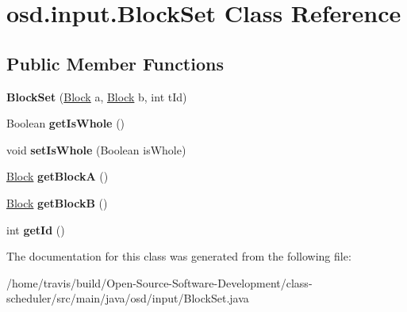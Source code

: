 \hypertarget{classosd_1_1input_1_1_block_set}{\section{osd.\-input.\-Block\-Set Class Reference}
\label{classosd_1_1input_1_1_block_set}
}
\subsection*{Public Member Functions}
\begin{DoxyCompactItemize}
\item 
\hypertarget{classosd_1_1input_1_1_block_set_a8fd250a4e0e3a3e750c9b196126b8d3f}{{\bfseries Block\-Set} (\hyperlink{interfaceosd_1_1input_1_1_block}{Block} a, \hyperlink{interfaceosd_1_1input_1_1_block}{Block} b, int t\-Id)}\label{classosd_1_1input_1_1_block_set_a8fd250a4e0e3a3e750c9b196126b8d3f}

\item 
\hypertarget{classosd_1_1input_1_1_block_set_a3783ae61ef0ac617b7a1a0bd8a7429b2}{Boolean {\bfseries get\-Is\-Whole} ()}\label{classosd_1_1input_1_1_block_set_a3783ae61ef0ac617b7a1a0bd8a7429b2}

\item 
\hypertarget{classosd_1_1input_1_1_block_set_a181c7721e45b3436f2fbf250016b84ca}{void {\bfseries set\-Is\-Whole} (Boolean is\-Whole)}\label{classosd_1_1input_1_1_block_set_a181c7721e45b3436f2fbf250016b84ca}

\item 
\hypertarget{classosd_1_1input_1_1_block_set_afee566d5e4864c98efbcd1905d8b6e2d}{\hyperlink{interfaceosd_1_1input_1_1_block}{Block} {\bfseries get\-Block\-A} ()}\label{classosd_1_1input_1_1_block_set_afee566d5e4864c98efbcd1905d8b6e2d}

\item 
\hypertarget{classosd_1_1input_1_1_block_set_a2afd5bc8227b04f9894fd4dc417fbfc9}{\hyperlink{interfaceosd_1_1input_1_1_block}{Block} {\bfseries get\-Block\-B} ()}\label{classosd_1_1input_1_1_block_set_a2afd5bc8227b04f9894fd4dc417fbfc9}

\item 
\hypertarget{classosd_1_1input_1_1_block_set_a38c5a636d48e3282af25c15f2269f2f5}{int {\bfseries get\-Id} ()}\label{classosd_1_1input_1_1_block_set_a38c5a636d48e3282af25c15f2269f2f5}

\end{DoxyCompactItemize}


The documentation for this class was generated from the following file\-:\begin{DoxyCompactItemize}
\item 
/home/travis/build/\-Open-\/\-Source-\/\-Software-\/\-Development/class-\/scheduler/src/main/java/osd/input/Block\-Set.\-java\end{DoxyCompactItemize}
